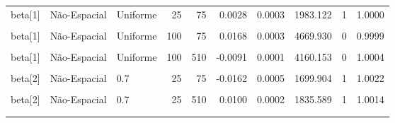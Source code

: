\documentclass[
]{article}
\begin{document}
\begin{longtable}[t]{lllrrrrrrr}
\cmidrule{1-10}\pagebreak[0]
beta[1] & Não-Espacial & Uniforme & 25 & 75 & 0.0028 & 0.0003 & 1983.122 & 1 & 1.0000\\
\cmidrule{1-10}\pagebreak[0]
\cellcolor{gray!10}{beta[1]} & \cellcolor{gray!10}{Espacial} & \cellcolor{gray!10}{Uniforme} & \cellcolor{gray!10}{100} & \cellcolor{gray!10}{75} & \cellcolor{gray!10}{0.0168} & \cellcolor{gray!10}{0.0003} & \cellcolor{gray!10}{4525.481} & \cellcolor{gray!10}{0} & \cellcolor{gray!10}{1.0005}\\
\cmidrule{1-10}\pagebreak[0]
beta[1] & Não-Espacial & Uniforme & 100 & 75 & 0.0168 & 0.0003 & 4669.930 & 0 & 0.9999\\
\cmidrule{1-10}\pagebreak[0]
\cellcolor{gray!10}{beta[1]} & \cellcolor{gray!10}{Espacial} & \cellcolor{gray!10}{Uniforme} & \cellcolor{gray!10}{100} & \cellcolor{gray!10}{510} & \cellcolor{gray!10}{-0.0091} & \cellcolor{gray!10}{0.0001} & \cellcolor{gray!10}{4671.257} & \cellcolor{gray!10}{0} & \cellcolor{gray!10}{0.9999}\\
\cmidrule{1-10}\pagebreak[0]
beta[1] & Não-Espacial & Uniforme & 100 & 510 & -0.0091 & 0.0001 & 4160.153 & 0 & 1.0004\\
\cmidrule{1-10}\pagebreak[0]
\cellcolor{gray!10}{beta[2]} & \cellcolor{gray!10}{Espacial} & \cellcolor{gray!10}{0.7} & \cellcolor{gray!10}{25} & \cellcolor{gray!10}{75} & \cellcolor{gray!10}{-0.0181} & \cellcolor{gray!10}{0.0006} & \cellcolor{gray!10}{1688.555} & \cellcolor{gray!10}{1} & \cellcolor{gray!10}{1.0031}\\
\cmidrule{1-10}\pagebreak[0]
beta[2] & Não-Espacial & 0.7 & 25 & 75 & -0.0162 & 0.0005 & 1699.904 & 1 & 1.0022\\
\cmidrule{1-10}\pagebreak[0]
\cellcolor{gray!10}{beta[2]} & \cellcolor{gray!10}{Espacial} & \cellcolor{gray!10}{0.7} & \cellcolor{gray!10}{25} & \cellcolor{gray!10}{510} & \cellcolor{gray!10}{0.0087} & \cellcolor{gray!10}{0.0001} & \cellcolor{gray!10}{1901.647} & \cellcolor{gray!10}{1} & \cellcolor{gray!10}{1.0008}\\
\cmidrule{1-10}\pagebreak[0]
beta[2] & Não-Espacial & 0.7 & 25 & 510 & 0.0100 & 0.0002 & 1835.589 & 1 & 1.0014\\
\cmidrule{1-10}\pagebreak[0]
\cellcolor{gray!10}{beta[2]} & \cellcolor{gray!10}{Espacial} & \cellcolor{gray!10}{0.7} & \cellcolor{gray!10}{100} & \cellcolor{gray!10}{75} & \cellcolor{gray!10}{-0.0111} & \cellcolor{gray!10}{0.0002} & \cellcolor{gray!10}{2332.090} & \cellcolor{gray!10}{1} & \cellcolor{gray!10}{1.0001}\\
\cmidrule{1-10}\pagebreak[0]

\end{longtable}
\end{document}

